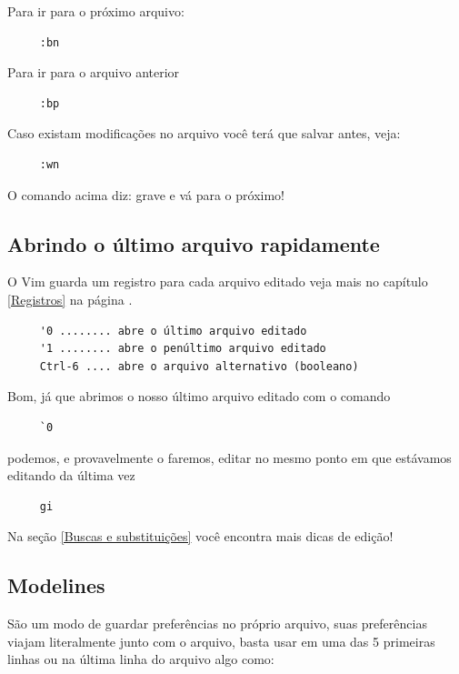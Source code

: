 \documentclass[10pt,a4paper,openany]{book}
\begin{document}
Para ir para o próximo arquivo:

\begin{verbatim}
     :bn
\end{verbatim}

Para ir para o arquivo anterior

\begin{verbatim}
     :bp
\end{verbatim}

Caso existam modificações no arquivo você terá que salvar antes, veja: 

\begin{verbatim}
     :wn
\end{verbatim}

O comando acima diz: grave e vá para o próximo!


\subsection{Abrindo o último arquivo rapidamente}
O Vim guarda um registro para cada arquivo editado veja
mais no capítulo \ref{Registros} na página \pageref{Registros}.

\begin{verbatim}
     '0 ........ abre o último arquivo editado
     '1 ........ abre o penúltimo arquivo editado
     Ctrl-6 .... abre o arquivo alternativo (booleano)
\end{verbatim}

Bom, já que abrimos o nosso último arquivo editado com o comando

\begin{verbatim}
     `0
\end{verbatim}

podemos, e provavelmente o faremos, editar no mesmo ponto em que estávamos
editando da última vez

\begin{verbatim}
     gi
\end{verbatim}

Na seção \ref{Buscas e substituições} você encontra mais dicas de edição!


\subsection{Modelines}\label{sec:Modelines}

São um modo de guardar preferências no próprio arquivo, suas
preferências viajam literalmente junto com o arquivo, basta usar em
uma das 5 primeiras linhas ou na última linha do arquivo algo
como:
\end{document}
